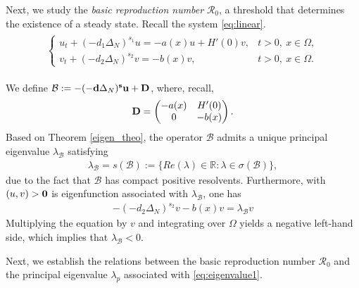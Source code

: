 \documentclass[a4paper,11pt]{amsart}
\theoremstyle{definition}
\def\R{\mathbb{R}}
\def\O{\Omega}
\numberwithin{equation}{section}
\theoremstyle{definition}
\def\O{\Omega}
\begin{document}
Next, we study the {\it basic reproduction number} $\mathcal{R}_0$, a threshold that determines the existence of a steady state. Recall the system \eqref{eq:linear}.
\begin{align*}
\begin{split}
\left\{\begin{array}{lllll}
u_t+(-d_1\Delta_N)^{s_1}u=-a(x)u+H'(0)v,&t>0,~x\in \O, \\
v_t+(-d_2\Delta_N)^{s_2}v=-b(x)v,&t>0,~x\in \O.
\end{array}\right.
\end{split}
\end{align*}%

 We define $\mathcal{B}:=-(-\mathbf{d}\Delta_N)^{\mathbf{s}}\mathbf{u}+\mathcal{\bf D}$, where, recall,
\begin{align*}
\mathcal{\bf D}=\begin{pmatrix}
-a(x)&H'(0)\\
0&-b(x)
\end{pmatrix}.
\end{align*}
Based on Theorem \ref{eigen_theo}, the operator $\mathcal{B}$ admits a unique principal eigenvalue $\lambda_{\mathcal{B}}$ satisfying
\begin{align*}
\lambda_{\mathcal{B}}=s(\mathcal{B}):=\{Re(\lambda)\in \R:\lambda \in \sigma({\mathcal{B}})\},
\end{align*}
due to the fact that $\mathcal{B}$ has compact positive resolvents. Furthermore, with $(u,v)>{\bf 0}$ is eigenfunction associated with $\lambda_{\mathcal{B}}$, one has
\begin{align*}
-(-d_2\Delta_N)^{s_2}v-b(x)v=\lambda_{\mathcal{B}}v
\end{align*}
Multiplying the equation by $v$ and integrating over $\Omega$ yields a negative left-hand side, which implies that $\lambda_{\mathcal{B}} < 0$.

Next, we establish the relations between the basic reproduction number $\mathcal{R}_0$ and the principal eigenvalue $\lambda_p$ associated with \eqref{eq:eigenvalue1}.
\end{document}
